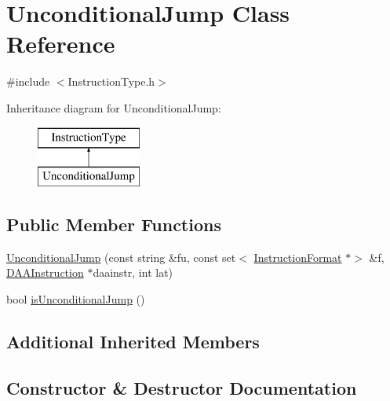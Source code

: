 \hypertarget{classUnconditionalJump}{}\section{Unconditional\+Jump Class Reference}
\label{classUnconditionalJump}


{\ttfamily \#include $<$Instruction\+Type.\+h$>$}

Inheritance diagram for Unconditional\+Jump\+:\begin{figure}[H]
\begin{center}
\leavevmode
\includegraphics[height=2.000000cm]{classUnconditionalJump}
\end{center}
\end{figure}
\subsection*{Public Member Functions}
\begin{DoxyCompactItemize}
\item 
\hyperlink{classUnconditionalJump_a011a19858383959186b82ce5470e530a}{Unconditional\+Jump} (const string \&fu, const set$<$ \hyperlink{classInstructionFormat}{Instruction\+Format} $\ast$$>$ \&f, \hyperlink{classDAAInstruction}{D\+A\+A\+Instruction} $\ast$daainstr, int lat)
\item 
bool \hyperlink{classUnconditionalJump_ab4588132d702a35f1dc1102dacba2be5}{is\+Unconditional\+Jump} ()
\end{DoxyCompactItemize}
\subsection*{Additional Inherited Members}


\subsection{Constructor \& Destructor Documentation}
\mbox{\label{classUnconditionalJump_a011a19858383959186b82ce5470e530a}} 
